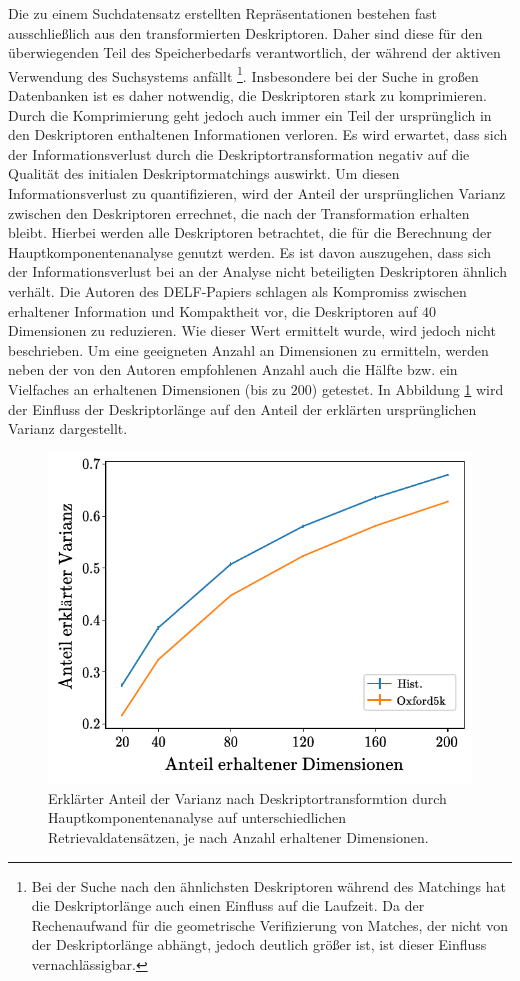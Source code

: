Die zu einem Suchdatensatz erstellten Repräsentationen bestehen fast ausschließlich aus den transformierten Deskriptoren. Daher sind diese für den überwiegenden Teil des Speicherbedarfs verantwortlich, der während der aktiven Verwendung des Suchsystems anfällt \footnote{Bei der Suche nach den ähnlichsten Deskriptoren während des Matchings hat die Deskriptorlänge auch einen Einfluss auf die Laufzeit. Da der Rechenaufwand für die geometrische Verifizierung von Matches, der nicht von der Deskriptorlänge abhängt, jedoch deutlich größer ist, ist dieser Einfluss vernachlässigbar.}. Insbesondere bei der Suche in großen Datenbanken ist es daher notwendig, die Deskriptoren stark zu komprimieren. Durch die Komprimierung geht jedoch auch immer ein Teil der ursprünglich in den Deskriptoren enthaltenen Informationen verloren. Es wird erwartet, dass sich der Informationsverlust durch die Deskriptortransformation negativ auf die Qualität des initialen Deskriptormatchings auswirkt. Um diesen Informationsverlust zu quantifizieren, wird der Anteil der ursprünglichen Varianz zwischen den Deskriptoren errechnet, die nach der Transformation erhalten bleibt. Hierbei werden alle Deskriptoren betrachtet, die für die Berechnung der Hauptkomponentenanalyse genutzt werden. Es ist davon auszugehen, dass sich der Informationsverlust bei an der Analyse nicht beteiligten Deskriptoren ähnlich verhält. Die Autoren des DELF-Papiers \cite{delf} schlagen als Kompromiss zwischen erhaltener Information und Kompaktheit vor, die Deskriptoren auf $40$ Dimensionen zu reduzieren. Wie dieser Wert ermittelt wurde, wird jedoch nicht beschrieben. Um eine geeigneten Anzahl an Dimensionen zu ermitteln, werden neben der von den Autoren empfohlenen Anzahl auch die Hälfte bzw. ein Vielfaches an erhaltenen Dimensionen (bis zu $200$) getestet. In Abbildung \ref{explained_variance_ratio} wird der Einfluss der Deskriptorlänge auf den Anteil der erklärten ursprünglichen Varianz dargestellt.
\begin{figure}[h]
\centering
\includegraphics[scale=1]{explained_variance.pdf}
\caption{Erklärter Anteil der Varianz nach Deskriptortransformtion durch Hauptkomponentenanalyse auf unterschiedlichen Retrievaldatensätzen, je nach Anzahl erhaltener Dimensionen.}
\label{explained_variance_ratio}
\end{figure}
